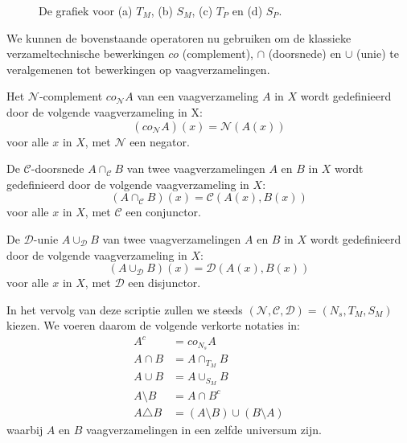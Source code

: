 \begin{figure}[bp]
\vspace{5pt}
\centering
{}
\vspace{5pt}
\caption{\label{fig:grafieken_normen}De grafiek voor (a) $T_M$, (b) $S_M$, (c) $T_P$ en 
(d) $S_P$.}
\end{figure}

We kunnen de bovenstaande operatoren nu gebruiken om de klassieke verzameltechnische bewerkingen 
$co$ (complement), $\cap$ (doorsnede) en $\cup$ (unie) te
veralgemenen tot bewerkingen op vaagverzamelingen.
\begin{definitie}
Het $\mathcal{N}$-complement $co_\mathcal{N} A$ van een vaagverzameling $A$ in $X$ wordt gedefinieerd
door de volgende vaagverzameling in X:
\begin{displaymath}
(co_\mathcal{N} A)(x) = \mathcal{N}(A(x))
\end{displaymath}
voor alle $x$ in $X$, met $\mathcal{N}$ een negator.
\end{definitie}
\begin{definitie}
De $\mathcal{C}$-doorsnede $A \cap_\mathcal{C} B$ van twee vaagverzamelingen $A$ en $B$ in $X$
wordt gedefinieerd door de volgende vaagverzameling in $X$:
\begin{displaymath}
(A \cap_\mathcal{C} B)(x) = \mathcal{C}(A(x),B(x))
\end{displaymath}
voor alle $x$ in $X$, met $\mathcal{C}$ een conjunctor.
\end{definitie}
\begin{definitie}
De $\mathcal{D}$-unie $A \cup_\mathcal{D} B$ van twee vaagverzamelingen $A$ en $B$ in $X$ wordt gedefinieerd door de
volgende vaagverzameling in $X$:
\begin{displaymath}
(A \cup_\mathcal{D} B)(x) = \mathcal{D}(A(x),B(x))
\end{displaymath}
voor alle $x$ in $X$, met $\mathcal{D}$ een disjunctor.
\end{definitie}
\noindent
In het vervolg van deze scriptie zullen we steeds 
$(\mathcal{N},\mathcal{C},\mathcal{D})=(N_s,T_M,S_M)$ kiezen. We voeren daarom de volgende
verkorte notaties in:
\begin{align*}
A^c 			&= co_{N_s} A \\
A \cap B 		&= A \cap_{T_M} B \\
A \cup B		&= A \cup_{S_M} B \\
A \setminus B  	&= A \cap B^c \\
A \triangle B 	&= (A \setminus B) \cup (B \setminus A)
\end{align*}
waarbij $A$ en $B$ vaagverzamelingen in een zelfde universum zijn.



